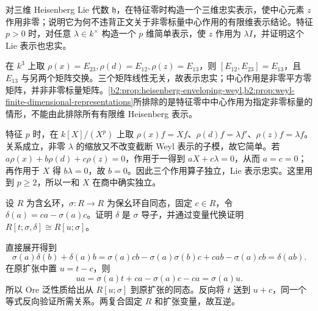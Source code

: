 \begin{optionalexercise}\label{b2:ex:20-heisenberg-central-character}
	对三维 Heisenberg Lie 代数 \(\mathfrak h\)，在特征零时构造一个三维忠实表示，使中心元素 \(z\) 作用非零；说明它为何不违背正文关于非零标量中心作用的有限维表示结论。特征 \(p>0\) 时，对任意 \(\lambda\in k^\times\) 构造一个 \(p\) 维简单表示，使 \(z\) 作用为 \(\lambda I\)，并证明这个 Lie 表示也忠实。
\end{optionalexercise}
\begin{solution}
	在 \(k^3\) 上取 \(\rho(x)=E_{23},\rho(d)=E_{12},\rho(z)=E_{13}\)，则 \([E_{12},E_{23}]=E_{13}\)，且 \(E_{13}\) 与另两个矩阵交换。三个矩阵线性无关，故表示忠实；中心作用是非零平方零矩阵，并非非零标量矩阵。\cref{b2:prop:heisenberg-enveloping-weyl,b2:prop:weyl-finite-dimensional-representations}所排除的是特征零中中心作用为指定非零标量的情形，不能由此排除所有有限维 Heisenberg 表示。

	特征 \(p\) 时，在 \(k[X]/(X^p)\) 上取 \(\rho(x)f=Xf\)、\(\rho(d)f=\lambda f'\)、\(\rho(z)f=\lambda f\)。关系成立，非零 \(\lambda\) 的缩放又不改变截断 Weyl 表示的子模，故它简单。若 \(a\rho(x)+b\rho(d)+c\rho(z)=0\)，作用于一得到 \(aX+c\lambda=0\)，从而 \(a=c=0\)；再作用于 \(X\) 得 \(b\lambda=0\)，故 \(b=0\)。因此三个作用算子独立，Lie 表示忠实。这里用到 \(p\ge2\)，所以一和 \(X\) 在商中确实独立。
\end{solution}

\begin{optionalexercise}\label{b2:ex:20-inner-sigma-derivation}
	设 \(R\) 为含幺环，\(\sigma:R\to R\) 为保幺环自同态，固定 \(c\in R\)，令 \(\delta(a)=ca-\sigma(a)c\)。证明 \(\delta\) 是 \(\sigma\) 导子，并通过变量代换证明 \(R[t;\sigma,\delta]\cong R[u;\sigma]\)。
\end{optionalexercise}
\begin{solution}
	直接展开得到
	\[
		\sigma(a)\delta(b)+\delta(a)b =\sigma(a)cb-\sigma(a)\sigma(b)c+cab-\sigma(a)cb =\delta(ab).
	\]
	在原扩张中置 \(u=t-c\)，则
	\[
		ua=\sigma(a)t+ca-\sigma(a)c-ca=\sigma(a)u.
	\]
	所以 Ore 泛性质给出从 \(R[u;\sigma]\) 到原扩张的同态。反向将 \(t\) 送到 \(u+c\)，同一个等式反向验证所需关系。两复合固定 \(R\) 和扩张变量，故互逆。
\end{solution}

